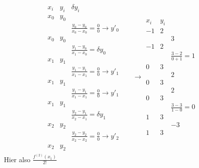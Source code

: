 \documentclass[10pt,a4paper]{article}
\begin{document}
	\begin{align*}
		\begin{array}{rr|lccc}
			x_i & y_i & \delta y_i &  &  \\ \hline
			x_0 & y_0 &  &  \\
			    &     & \frac{y_0-y_0}{x_0-x_0}=\frac{0}{0}\rightarrow y'_0 &  \\
			x_0 & y_0 &  &  \\
			    &     & \frac{y_1-y_0}{x_1-x_0}=\delta y_0 &  \\
			x_1 & y_1 &  &  \\
			    &     & \frac{y_1-y_1}{x_1-x_1}=\frac{0}{0}\rightarrow y'_1 &  \\
			x_1 & y_1 &  &  \\
			    &     & \frac{y_1-y_1}{x_1-x_1}=\frac{0}{0}\rightarrow y'_1 &  \\
			x_1 & y_1 &  &  \\
			    &     & \frac{y_2-y_1}{x_2-x_1}=\delta y_1 &  \\
			x_2 & y_2 &  &  \\
			    &     & \frac{y_2-y_2}{x_2-x_2}=\frac{0}{0}\rightarrow y'_2 &  \\
			x_2 & y_2 &
		\end{array}
			\rightarrow
				\begin{array}{cc|rccc}
					x_i & y_i &  &  &  \\ \hline
					-1  &  2  &  &  \\
					    &     & 3 &  \\
					-1  &  2  &  &  \\
					    &     & \frac{3-2}{0+1}=1 &  \\
					 0  &  3  &  &  \\
					    &     & 2 &  \\
					 0  &  3  &  &  \\
					    &     & 2 &  \\
					 0  &  3  &  &  \\
					    &     & \frac{3-3}{1-0}=0 &  \\
					 1  &  3  &  &  \\
					    &     & -3 &  \\
					 1  &  3  &  &
				\end{array}
	\end{align*}
	Hier also $\frac{f^{(2)}(x_1)}{2!}$
\end{document}
